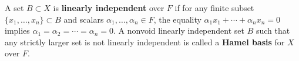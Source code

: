 A set \(B \subset X\) is \textbf{linearly independent} over \(F\) if for any finite subset \(\{x_1, \ldots, x_n\} \subset B\) and scalars \(\alpha_1, \ldots, \alpha_n \in F\), the equality \(\alpha_1 x_1 + \cdots + \alpha_n x_n = 0\) implies \(\alpha_1 = \alpha_2 = \cdots = \alpha_n = 0\). A nonvoid linearly independent set \(B\) such that any strictly larger set is not linearly independent is called a \textbf{Hamel basis} for \(X\) over \(F\).